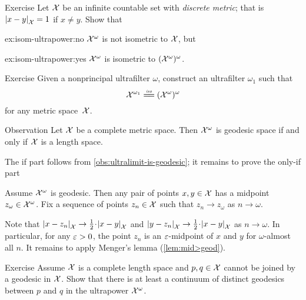 \begin{thm}{Exercise}\label{ex:isom-ultrapower}
Let $\mathcal{X}$ be an infinite countable set with \emph{discrete metric};
that is $\dist{x}{y}{\spc{X}}=1$ if $x\ne y$.
Show that 

\begin{subthm}{ex:isom-ultrapower:no}
$\mathcal{X}^\omega$ is not isometric to $\mathcal{X}$, but
\end{subthm}

\begin{subthm}{ex:isom-ultrapower:yes}
$\mathcal{X}^\omega$ is  isometric to $(\mathcal{X}^\omega)^\omega$.
\end{subthm}

\end{thm}

\begin{thm}{Exercise}\label{ex:ultrapower(ultrapower)}
Given a nonprincipal ultrafilter $\omega$, construct an ultrafilter $\omega_1$ such that 
\[\spc{X}^{\omega_1}\iso(\spc{X}^\omega)^\omega\]
for any metric space~$\mathcal{X}$.

\end{thm}


\begin{thm}{Observation}\label{obs:ultrapower-is-geodesic}
Let $\mathcal{X}$ be a complete metric space. 
Then $\mathcal{X}^\omega$ is geodesic space if and only if $\mathcal{X}$ is a length space.
\end{thm}

The if part follows from \ref{obs:ultralimit-is-geodesic}; it remains to prove the only-if part

Assume $\mathcal{X}^\omega$ is geodesic.
Then any pair of points $x,y\in \mathcal{X}$ has a midpoint $z_\omega\in\mathcal{X}^\omega$.
Fix a sequence of points $z_n\in  \mathcal{X}$ such that $z_n\to z_\omega$ as $n\to \omega$.

Note that 
$\dist{x}{z_n}{\spc{X}}\to \tfrac12\cdot \dist{x}{y}{\spc{X}}$
and 
$\dist{y}{z_n}{\spc{X}}\to \tfrac12\cdot \dist{x}{y}{\spc{X}}$
as 
$n\to\omega$.
In particular, for any $\varepsilon>0$, the point $z_n$ is an $\varepsilon$-midpoint of $x$ and $y$ for $\omega$-almost all $n$.
It remains to apply Menger's lemma (\ref{lem:mid>geod}).
\qeds

\begin{thm}{Exercise}\label{ex:two-geodesics-in-ultrapower}
Assume $\mathcal{X}$ is a complete length space 
and $p,q\in\mathcal{X}$ cannot be joined by a geodesic in $\mathcal{X}$.  
Show that there is at least a continuum of distinct geodesics between $p$ and $q$ 
in the ultrapower $\mathcal{X}^\omega$.
\end{thm}

